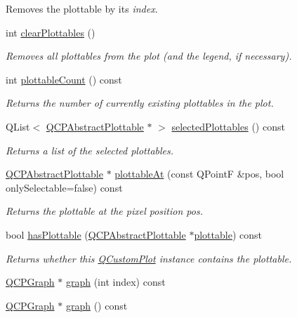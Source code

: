 \begin{DoxyCompactItemize}
\begin{DoxyCompactList}
Removes the plottable by its {\itshape index}. \end{DoxyCompactList}\item 
int \hyperlink{a00116_a9a409bb3201878adb7ffba1c89c4e004}{clear\+Plottables} ()
\begin{DoxyCompactList}\small\item\em Removes all plottables from the plot (and the legend, if necessary). \end{DoxyCompactList}\item 
int \hyperlink{a00116_a2dbfbf15dc38713f9a1c445a3dd2e989}{plottable\+Count} () const 
\begin{DoxyCompactList}\small\item\em Returns the number of currently existing plottables in the plot. \end{DoxyCompactList}\item 
Q\+List$<$ \hyperlink{a00024}{Q\+C\+P\+Abstract\+Plottable} $\ast$ $>$ \hyperlink{a00116_a6721b8c689bb7f2f400987e580508fe8}{selected\+Plottables} () const 
\begin{DoxyCompactList}\small\item\em Returns a list of the selected plottables. \end{DoxyCompactList}\item 
\hyperlink{a00024}{Q\+C\+P\+Abstract\+Plottable} $\ast$ \hyperlink{a00116_ac1d1bc6ae4e13616fb02cef6d9e2188e}{plottable\+At} (const Q\+Point\+F \&pos, bool only\+Selectable=false) const 
\begin{DoxyCompactList}\small\item\em Returns the plottable at the pixel position {\itshape pos}. \end{DoxyCompactList}\item 
bool \hyperlink{a00116_a4fc28914e2ee91aab424b7ce46b6bdf1}{has\+Plottable} (\hyperlink{a00024}{Q\+C\+P\+Abstract\+Plottable} $\ast$\hyperlink{a00116_afe26a6b79add0a11ae52f5700534ddb7}{plottable}) const 
\begin{DoxyCompactList}\small\item\em Returns whether this \hyperlink{a00030_d8/d00/a00186}{Q\+Custom\+Plot} instance contains the {\itshape plottable}. \end{DoxyCompactList}\item 
\hyperlink{a00031}{Q\+C\+P\+Graph} $\ast$ \hyperlink{a00116_ac6b19830ab0f0073ff3089cf7c9b3c2e}{graph} (int index) const 
\item 
\hyperlink{a00031}{Q\+C\+P\+Graph} $\ast$ \hyperlink{a00116_ab2463cfbef0d48d1829418647431bf35}{graph} () const 

\end{DoxyCompactItemize}

